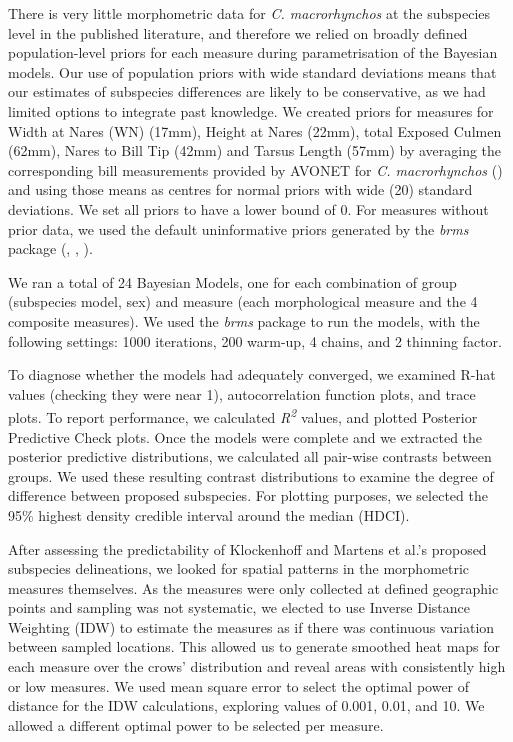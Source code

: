\documentclass[10pt,a4paper]{article}
\begin{document}
There is very little morphometric data for \emph{C. macrorhynchos} at the subspecies level in the published literature, and therefore we relied on broadly defined population-level priors for each measure during parametrisation of the Bayesian models.
Our use of population priors with wide standard deviations means that our estimates of subspecies differences are likely to be conservative, as we had limited options to integrate past knowledge.
We created priors for measures for Width at Nares (WN) (17mm), Height at Nares (22mm), total Exposed Culmen (62mm), Nares to Bill Tip (42mm) and Tarsus Length (57mm) by averaging the corresponding bill measurements provided by AVONET for \emph{C. macrorhynchos} () and using those means as centres for normal priors with wide (20) standard deviations.
We set all priors to have a lower bound of 0.
For measures without prior data, we used the default uninformative priors generated by the \emph{brms} package (, , ).

We ran a total of 24 Bayesian Models, one for each combination of group (subspecies model, sex) and measure (each morphological measure and the 4 composite measures).
We used the \emph{brms} package to run the models, with the following settings: 1000 iterations, 200 warm-up, 4 chains, and 2 thinning factor.

To diagnose whether the models had adequately converged, we examined R-hat values (checking they were near 1), autocorrelation function plots, and trace plots.
To report performance, we calculated \emph{R\textsuperscript{2}} values, and plotted Posterior Predictive Check plots.
Once the models were complete and we extracted the posterior predictive distributions, we calculated all pair-wise contrasts between groups.
We used these resulting contrast distributions to examine the degree of difference between proposed subspecies.
For plotting purposes, we selected the 95\% highest density credible interval around the median (HDCI).

After assessing the predictability of Klockenhoff and Martens et al.'s proposed subspecies delineations, we looked for spatial patterns in the morphometric measures themselves.
As the measures were only collected at defined geographic points and sampling was not systematic, we elected to use Inverse Distance Weighting (IDW) to estimate the measures as if there was continuous variation between sampled locations.
This allowed us to generate smoothed heat maps for each measure over the crows' distribution and reveal areas with consistently high or low measures.
We used mean square error to select the optimal power of distance for the IDW calculations, exploring values of 0.001, 0.01, and 10.
We allowed a different optimal power to be selected per measure.
\end{document}
